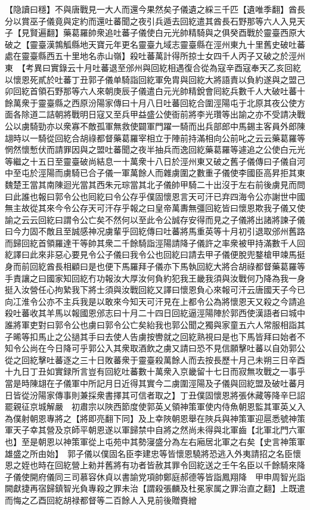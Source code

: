 【隐讀曰穩】不與唐戰見一大人而還今果然矣子儀遺之綵三千匹【遺唯季翻】酋長分以賞巫子儀竟與定約而還吐蕃聞之夜引兵遁去回紇遣其酋長石野那等六人入見天子【見賢遍翻】藥葛羅帥衆追吐蕃子儀使白元光帥精騎與之俱癸酉戰於靈臺西原大破之【靈臺漢鶉觚縣地天寶元年更名靈臺九域志靈臺縣在涇州東九十里舊史破吐蕃處在靈臺縣西五十里地名赤山嶺】殺吐蕃萬計得所掠士女四千人丙子又破之於涇州東　【考異曰實錄云十月吐蕃退至邠州與回紇相遇復合從為寇辛酉寇奉天乙亥回紇以懷恩死貳於吐蕃丁丑郭子儀单騎詣回紇軍免胄與回紇大將語責以負約遂與之盟己卯回紇首領石野那等六人來朝庚辰子儀遣白元光帥精銳會囘紇兵數千人大破吐蕃十餘萬衆于靈臺縣之西原汾陽家傳曰十月八日吐蕃回紇合圍涇陽屯于北原其夜公使方面各除道二詰朝將戰明日寇又至兵甲益盛公使衙前將李光瓚等出諭之亦不受請决戰公以虜騎勁亦以衆寡不敵孤軍無救使闢軍門躍一騎而出兵部郎中馬錫主客員外郎陳翃時以一騎從回紇合胡祿都督藥葛羅宰相立于陣前持滿相向公前叱之云云藥葛羅等惘然懷慙伏而請罪因與之盟吐蕃聞之夜半抽兵而逸回紇藥葛羅等遽追之公使白元光等繼之十五日至靈臺破尚結息一十萬衆十八日於涇州東又破之舊子儀傳曰子儀自河中至屯於涇陽而虜騎已合子儀一軍萬餘人而雜虜圍之數重子儀使李國臣高昇拒其東魏楚王當其南陳迴光當其西朱元琮當其北子儀帥甲騎二十出沒于左右前後虜見而問曰此誰也報曰郭令公也囘紇曰令公存乎僕固懷恩言天可汗已弃四海令公亦謝世中國無主故從其來今令公存天可汗存乎報之曰皇帝萬夀無彊回紇皆曰懷恩欺我子儀又使諭之云云回紇曰謂令公亡矣不然何以至此令公誠存安得而見之子儀將出諸將諫子儀曰今力固不敵且至誠感神况虜輩乎回紇傳曰吐蕃將馬重英等十月初引退取邠州舊路而歸回紇首領羅達干等帥其衆二千餘騎詣涇陽請降子儀許之率衆被甲持滿數千人回紇譯曰此來非惡心要見令公子儀曰我令公也回紇曰請去甲子儀便脫兜鍪槍甲竦馬挺身而前回紇酋長相顧曰是也便下馬羅拜子儀亦下馬執回紇大將合胡祿都督藥葛羅等手責讓之曰國家知回紇冇功報汝大厚汝何負約犯我王畿我須與汝戰何乃降為我一身挺入汝營任心拘縶我下將士須與汝戰回紇又譯曰懷恩負心來報可汗云唐國天子今已向冮淮令公亦不主兵我是以敢來今知天可汗見在上都令公為將懷恩天又殺之今請追殺吐蕃收其羊馬以報國恩邠志曰十月二十四日回紇逼涇陽陣於郭西使漢語者曰城中誰將軍吏對曰郭令公也虜曰郭令公亡矣紿我也郭公聞之獨與家童五六人常服相詣其子晞等扣馬止之公撾其手曰去使人告虜按轡就之回紇熟視曰是也下馬皆拜曰始者不知令公尚在今日降可乎郭公入其衆取酒飲之虜又請曰恐不見信願擊吐蕃以自効郭公從之回紇擊吐蕃逐之三十日敗蕃衆于靈臺殺萬餘人而去按長歷十月己未朔三日辛酉十九日丁丑如實録所言豈有回紇吐蕃數十萬衆入京畿留十七日而寂無攻戰之一事乎當是時陳翃在子儀軍中所記月日近得其實今二虜圍涇陽及子儀與回紇盟及破吐蕃月日皆從汾陽家傳事則兼採衆書擇其可信者取之】丁丑僕固懷恩將張休藏等降辛巳詔罷親征京城解嚴　初肅宗以陜西節度使郭英乂領神策軍使内侍魚朝恩監其軍英乂入為僕射朝恩專將之【將即亮翻下同】及上幸陜朝恩舉在陜兵與神策軍迎扈悉號神策軍天子幸其營及京師平朝恩遂以軍歸禁中自將之然尚未得與北軍齒【北軍北門六軍也】至是朝恩以神策軍從上屯苑中其勢寖盛分為左右廂居北軍之右矣【史言神策軍雄盛之所由始】　郭子儀以僕固名臣李建忠等皆懷恩驍將恐逃入外夷請招之名臣懷恩之姪也時在回紇營上勑并舊將有功者皆赦其罪令回紇送之壬午名臣以千餘騎來降子儀使開府儀同三司慕容休貞以書諭党項帥鄭庭郝德等皆詣鳳翔降　甲申周智光詣闕獻捷再宿歸鎮智光負專殺之罪未治【謂殺張麟及杜冕家属之罪治直之翻】上既遣而悔之乙酉回紇胡禄都督等二百餘人入見前後贈賚繒

